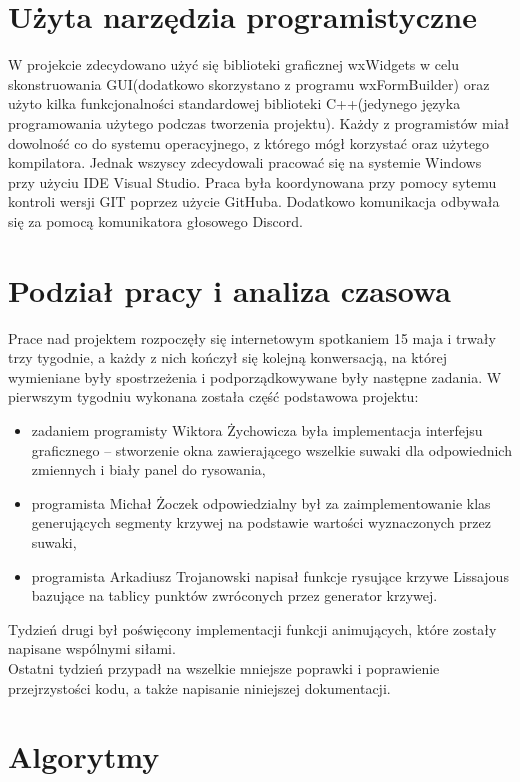 \section{Użyta narzędzia programistyczne}
W projekcie zdecydowano użyć się biblioteki graficznej wxWidgets w celu skonstruowania GUI(dodatkowo skorzystano z programu wxFormBuilder) oraz użyto kilka funkcjonalności standardowej biblioteki C++(jedynego języka programowania użytego podczas tworzenia projektu). Każdy z programistów miał dowolność co do systemu operacyjnego, z którego mógł korzystać oraz użytego kompilatora. Jednak wszyscy zdecydowali pracować się na systemie Windows przy użyciu IDE Visual Studio. Praca była koordynowana przy pomocy sytemu kontroli wersji GIT poprzez użycie GitHuba. Dodatkowo komunikacja odbywała się za pomocą komunikatora głosowego Discord. 
\section{Podział pracy i analiza czasowa}
Prace nad projektem rozpoczęły się internetowym spotkaniem 15 maja i trwały trzy tygodnie, a każdy z nich kończył się kolejną konwersacją, na której wymieniane były spostrzeżenia i podporządkowywane były następne zadania. W pierwszym tygodniu wykonana została część podstawowa projektu:
\begin{itemize}
	\item zadaniem programisty Wiktora Żychowicza była implementacja interfejsu graficznego – stworzenie okna zawierającego wszelkie suwaki dla odpowiednich zmiennych i biały panel do rysowania,
	\item programista Michał Żoczek odpowiedzialny był za zaimplementowanie klas generujących segmenty krzywej na podstawie wartości wyznaczonych przez suwaki,
	\item	programista Arkadiusz Trojanowski napisał funkcje rysujące krzywe Lissajous bazujące na tablicy punktów zwróconych przez generator krzywej.
\end{itemize}

Tydzień drugi był poświęcony implementacji funkcji animujących, które zostały napisane wspólnymi siłami.\\
Ostatni tydzień przypadł na wszelkie mniejsze poprawki i poprawienie przejrzystości kodu, a także napisanie niniejszej dokumentacji.

	\section{Algorytmy}
